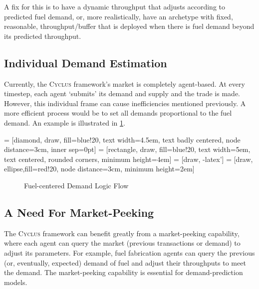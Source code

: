 \documentclass{article}
\newcommand{\Cyclus}{\textsc{Cyclus}\xspace}%
\begin{document}
A fix for this is to have a dynamic throughput that adjusts according
to predicted fuel demand, or, more realistically, have an archetype with fixed, reasonable, throughput/buffer
that is deployed when there is fuel demand beyond its predicted throughput.



\subsection{Individual Demand Estimation}
Currently, the \Cyclus framework's market is completely agent-based. At every timestep, each agent `submits' its
demand and supply and the trade is made. However, this individual frame can cause inefficiencies mentioned previously.
A more efficient process would be to set all demands proportional to the fuel demand. An example is illustrated
in \cref{diag:hd}.

 = [diamond, draw, fill=blue!20, 
text width=4.5em, text badly centered, node distance=3cm, inner sep=0pt]
 = [rectangle, draw, fill=blue!20, 
text width=5em, text centered, rounded corners, minimum height=4em]
 = [draw, -latex']
 = [draw, ellipse,fill=red!20, node distance=3cm,
minimum height=2em]


\begin{figure}
	\centering
	\caption{Fuel-centered Demand Logic Flow}
	\label{diag:hd}
\end{figure}
 

\subsection{A Need For Market-Peeking}
The \Cyclus framework can benefit greatly from a market-peeking capability,
where each agent can query the market (previous transactions or demand) to adjust its parameters. For example, fuel fabrication
agents can query the previous (or, eventually, expected) demand of fuel and adjust their throughputs to meet the demand. 
The market-peeking capability is essential for demand-prediction models.
\end{document}

